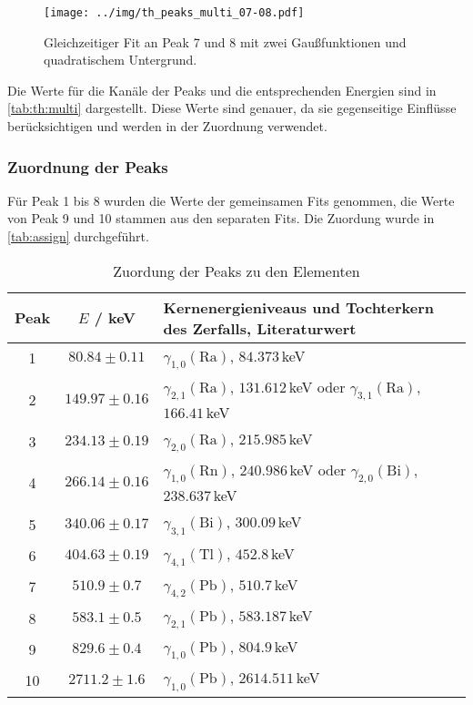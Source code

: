 \begin{figure}[H]
\begin{center}
  \texttt{[image: ../img/th\_peaks\_multi\_07-08.pdf]}
  \caption{Gleichzeitiger Fit an Peak 7 und 8 mit zwei Gaußfunktionen und quadratischem Untergrund.}
  \label{img:th:peaks:multi:0708}
\end{center}
\end{figure}
Die Werte für die Kanäle der Peaks und die entsprechenden Energien sind in \autoref{tab:th:multi} dargestellt. Diese Werte sind genauer, da sie 
gegenseitige Einflüsse berücksichtigen und werden in der Zuordnung verwendet.


\subsubsection{Zuordnung der Peaks}
Für Peak 1 bis 8 wurden die Werte der gemeinsamen Fits genommen, die Werte von Peak 9 und 10 stammen aus den separaten Fits.
Die Zuordung wurde in \autoref{tab:assign} durchgeführt.\\[\baselineskip]
\begin{table}
\caption{Zuordung der Peaks zu den Elementen}
\begin{center}
\begin{tabularx}{\textwidth}{|c|c|X|}
  \hline 
    Peak & $E$ / keV & Kernenergieniveaus und Tochterkern des Zerfalls, Literaturwert \\ \hline
      1 & $  80.84 \pm 0.11 $ &  $\gamma_{1,0}(\text{Ra})$, $84.373$\,keV \\ \hline
      2 & $ 149.97 \pm 0.16 $ &  $\gamma_{2,1}(\text{Ra})$, $131.612$\,keV oder $\gamma_{3,1}(\text{Ra})$, $166.41$\,keV \\ \hline
      3 & $ 234.13 \pm 0.19 $ &  $\gamma_{2,0}(\text{Ra})$, $215.985$\,keV \\ \hline
      4 & $ 266.14 \pm 0.16 $ &  $\gamma_{1,0}(\text{Rn})$, $240.986$\,keV oder $\gamma_{2,0}(\text{Bi})$, $238.637$\,keV \\ \hline
      5 & $ 340.06 \pm 0.17 $ &  $\gamma_{3,1}(\text{Bi})$, $300.09$\,keV \\ \hline
      6 & $ 404.63 \pm 0.19 $ &  $\gamma_{4,1}(\text{Tl})$, $452.8$\,keV \\ \hline
      7 & $ 510.9  \pm 0.7  $ &  $\gamma_{4,2}(\text{Pb})$, $510.7$\,keV \\ \hline
      8 & $ 583.1  \pm 0.5  $ &  $\gamma_{2,1}(\text{Pb})$, $583.187$\,keV \\ \hline
      9 & $ 829.6  \pm 0.4  $ &  $\gamma_{1,0}(\text{Pb})$, $804.9$\,keV \\ \hline
     10 & $ 2711.2 \pm 1.6  $ &  $\gamma_{1,0}(\text{Pb})$, $2614.511$\,keV \\ \hline
\end{tabularx}
\end{center}
\label{tab:assign}
\end{table}
